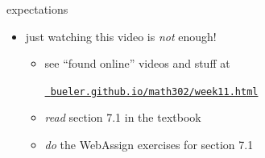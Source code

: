 \documentclass[urlcolor=blue,dvipsnames]{beamer}
\begin{document}
\begin{frame}{expectations}

\begin{itemize}
\item just watching this video is \emph{not} enough!
     \begin{itemize}
     \item see ``found online'' videos and stuff at

     \centerline{\href{https://bueler.github.io/math302/week11.html}{\tt \color{cyan} bueler.github.io/math302/week11.html}}
     \item \emph{read} section 7.1 in the textbook
     \item \emph{do} the WebAssign exercises for section 7.1
     \end{itemize}
\end{itemize}
\end{frame}
\end{document}
